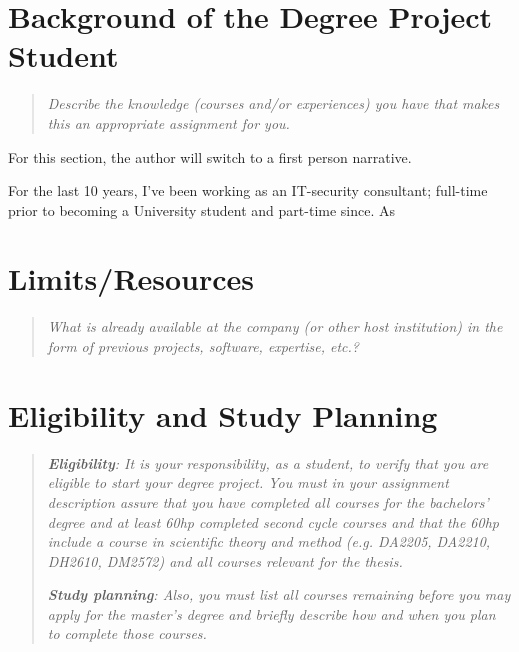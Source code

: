 \documentclass[12pt, a4paper]{article}
\begin{document}

\section{Background of the Degree Project Student}

\begin{quote}
	\textit{Describe the knowledge (courses and/or experiences) you have that makes this an appropriate assignment for you.}
\end{quote}

For this section, the author will switch to a first person narrative.

For the last 10 years, I've been working as an IT-security consultant; full-time prior to becoming a University student and part-time since. As 

\section{Limits/Resources}

\begin{quote}
	\textit{What is already available at the company (or other host institution) in the form of previous projects, software, expertise, etc.?}
\end{quote}



\section{Eligibility and Study Planning}

\begin{quote}
	\textit{\textbf{Eligibility}: It is your responsibility, as a student, to verify that you are eligible to start your degree project. You must in your assignment description assure that you have completed all courses for the bachelors' degree and at least 60hp completed second cycle courses and that the 60hp include a course in scientific theory and method (e.g. DA2205, DA2210, DH2610, DM2572) and all courses relevant for the thesis.}

	\textit{\textbf{Study planning}: Also, you must list all courses remaining before you may apply for the master's degree and briefly describe how and when you plan to complete those courses.}
\end{quote}
\end{document}
